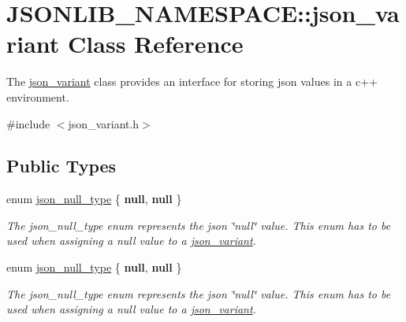 \hypertarget{classJSONLIB__NAMESPACE_1_1json__variant}{}\section{J\+S\+O\+N\+L\+I\+B\+\_\+\+N\+A\+M\+E\+S\+P\+A\+CE\+:\+:json\+\_\+variant Class Reference}
\label{classJSONLIB__NAMESPACE_1_1json__variant}


The \hyperlink{classJSONLIB__NAMESPACE_1_1json__variant}{json\+\_\+variant} class provides an interface for storing json values in a c++ environment.  




{\ttfamily \#include $<$json\+\_\+variant.\+h$>$}

\subsection*{Public Types}
\begin{DoxyCompactItemize}
\item 
enum \hyperlink{classJSONLIB__NAMESPACE_1_1json__variant_a1251d2c28258eeebea991ed0b39c3e0c}{json\+\_\+null\+\_\+type} \{ {\bfseries null}, 
{\bfseries null}
 \}\begin{DoxyCompactList}\small\item\em The json\+\_\+null\+\_\+type enum represents the json \char`\"{}null\char`\"{} value. This enum has to be used when assigning a null value to a \hyperlink{classJSONLIB__NAMESPACE_1_1json__variant}{json\+\_\+variant}. \end{DoxyCompactList}
\item 
enum \hyperlink{classJSONLIB__NAMESPACE_1_1json__variant_a1251d2c28258eeebea991ed0b39c3e0c}{json\+\_\+null\+\_\+type} \{ {\bfseries null}, 
{\bfseries null}
 \}\begin{DoxyCompactList}\small\item\em The json\+\_\+null\+\_\+type enum represents the json \char`\"{}null\char`\"{} value. This enum has to be used when assigning a null value to a \hyperlink{classJSONLIB__NAMESPACE_1_1json__variant}{json\+\_\+variant}. \end{DoxyCompactList}
\end{DoxyCompactItemize}
